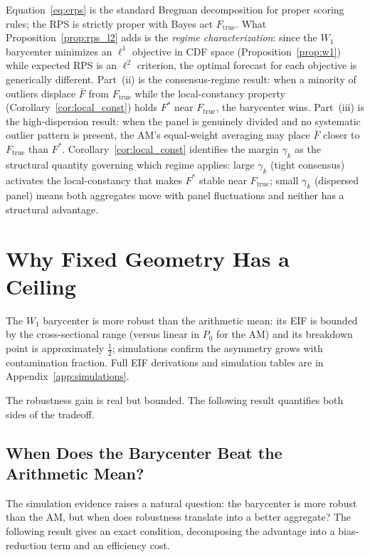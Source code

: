 \begin{remark}
Equation~\eqref{eq:erps} is the standard Bregman decomposition for proper scoring rules; the RPS is strictly proper with Bayes act $F_{\mathrm{true}}$.  What Proposition~\ref{prop:rps_l2} adds is the \emph{regime characterization}: since the $W_1$ barycenter minimizes an $\ell^1$ objective in CDF space (Proposition~\ref{prop:w1}) while expected RPS is an $\ell^2$ criterion, the optimal forecast for each objective is generically different.  Part~(ii) is the consensus-regime result: when a minority of outliers displace $\bar{F}$ from $F_{\mathrm{true}}$ while the local-constancy property (Corollary~\ref{cor:local_const}) holds $F^*$ near $F_{\mathrm{true}}$, the barycenter wins.  Part~(iii) is the high-dispersion result: when the panel is genuinely divided and no systematic outlier pattern is present, the AM's equal-weight averaging may place $\bar{F}$ closer to $F_{\mathrm{true}}$ than $F^*$.  Corollary~\ref{cor:local_const} identifies the margin $\gamma_k$ as the structural quantity governing which regime applies: large $\gamma_k$ (tight consensus) activates the local-constancy that makes $F^*$ stable near $F_{\mathrm{true}}$; small $\gamma_k$ (dispersed panel) means both aggregates move with panel fluctuations and neither has a structural advantage.
\end{remark}

\section{Why Fixed Geometry Has a Ceiling}
\label{sec:robustness}

The $W_1$ barycenter is more robust than the arithmetic mean: its EIF is bounded by the cross-sectional range (versus linear in $P_0$ for the AM) and its breakdown point is approximately $\tfrac{1}{2}$; simulations confirm the asymmetry grows with contamination fraction.
Full EIF derivations and simulation tables are in Appendix~\ref{app:simulations}.

The robustness gain is real but bounded.
The following result quantifies both sides of the tradeoff.

\subsection*{When Does the Barycenter Beat the Arithmetic Mean?}
\label{sec:c2prime}

The simulation evidence raises a natural question: the barycenter is more robust than the AM,
but when does robustness translate into a better aggregate?  The following result gives an
exact condition, decomposing the advantage into a bias-reduction term and an efficiency cost.

